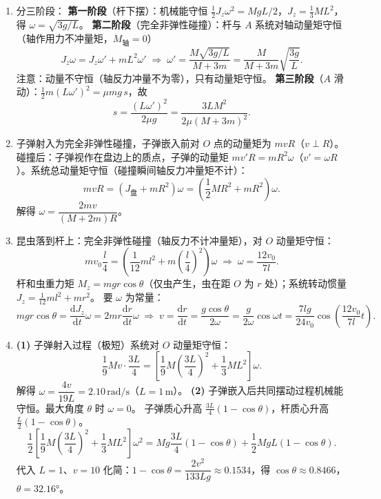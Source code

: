 \documentclass[12pt]{article}
\begin{document}
\begin{enumerate}[label=\textbf{例\arabic*.}, leftmargin=*]
\item 分三阶段：
\textbf{第一阶段}（杆下摆）：机械能守恒 $\tfrac{1}{2}J_z\omega^2 = MgL/2$，$J_z=\tfrac{1}{3}ML^2$，得 $\omega = \sqrt{3g/L}$。
\textbf{第二阶段}（完全非弹性碰撞）：杆与 $A$ 系统对轴动量矩守恒（轴作用力不冲量矩，$M_\text{轴}=0$）
\[
  J_z\omega = J_z\omega' + mL^2\omega' \;\Rightarrow\;
  \omega' = \frac{M\sqrt{3g/L}}{M+3m} = \frac{M}{M+3m}\sqrt{\frac{3g}{L}}.
\]
注意：动量不守恒（轴反力冲量不为零），只有动量矩守恒。
\textbf{第三阶段}（$A$ 滑动）：$\tfrac{1}{2}m(L\omega')^2 = \mu mg\,s$，故
\[
  s = \frac{(L\omega')^2}{2\mu g} = \frac{3LM^2}{2\mu(M+3m)^2}.
\]

\item 子弹射入为完全非弹性碰撞，子弹嵌入前对 $O$ 点的动量矩为 $mvR$（$v\perp R$）。
碰撞后：子弹视作在盘边上的质点，子弹的动量矩 $mv'R = mR^2\omega$（$v'=\omega R$）。系统总动量矩守恒（碰撞瞬间轴反力冲量矩不计）：
\[
  mvR = (J_\text{盘}+mR^2)\omega = \left(\frac{1}{2}MR^2 + mR^2\right)\omega.
\]
解得 $\omega = \dfrac{2mv}{(M+2m)R}$。

\item 昆虫落到杆上：完全非弹性碰撞（轴反力不计冲量矩），对 $O$ 动量矩守恒：
\[
  mv_0\frac{l}{4} = \left(\frac{1}{12}ml^2 + m\!\left(\frac{l}{4}\right)^2\right)\omega
  \;\Rightarrow\; \omega = \frac{12v_0}{7l}.
\]
杆和虫重力矩 $M_z = mgr\cos\theta$（仅虫产生，虫在距 $O$ 为 $r$ 处）；系统转动惯量 $J_z = \tfrac{1}{12}ml^2 + mr^2$。
要 $\omega$ 为常量：
\[
  mgr\cos\theta = \frac{\mathrm{d}J_z}{\mathrm{d}t}\omega = 2mr\frac{\mathrm{d}r}{\mathrm{d}t}\omega \;\Rightarrow\;
  v = \frac{\mathrm{d}r}{\mathrm{d}t} = \frac{g\cos\theta}{2\omega} = \frac{g}{2\omega}\cos\omega t
  = \frac{7lg}{24v_0}\cos\!\left(\frac{12v_0}{7l}t\right).
\]

\item \textbf{(1)} 子弹射入过程（极短）系统对 $O$ 动量矩守恒：
\[
  \frac{1}{9}Mv\cdot\frac{3L}{4} = \left[\frac{1}{9}M\!\left(\frac{3L}{4}\right)^2+\frac{1}{3}ML^2\right]\omega.
\]
解得 $\omega = \dfrac{4v}{19L} = 2.10\,\mathrm{rad/s}$（$L=1\,\mathrm{m}$）。
\textbf{(2)} 子弹嵌入后共同摆动过程机械能守恒。最大角度 $\theta$ 时 $\omega=0$。
子弹质心升高 $\frac{3L}{4}(1-\cos\theta)$，杆质心升高 $\frac{L}{2}(1-\cos\theta)$。
\[
  \frac{1}{2}\!\left[\frac{1}{9}M\!\left(\frac{3L}{4}\right)^2+\frac{1}{3}ML^2\right]\omega^2
  = Mg\frac{3L}{4}\!\left(1-\cos\theta\right) + \frac{1}{2}MgL(1-\cos\theta).
\]
代入 $L=1$、$v=10$ 化简：$1-\cos\theta = \dfrac{2v^2}{133Lg} \approx 0.1534$，得 $\cos\theta \approx 0.8466$，$\theta = 32.16°$。

\end{enumerate}
\end{document}
